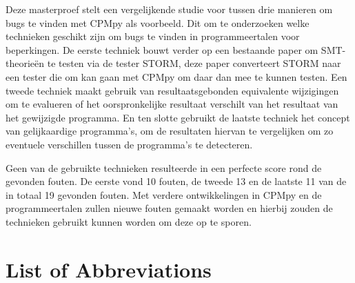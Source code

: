 \documentclass[master=cws, masteroption=se, english, oneside]{kulemt} %
\begin{document}
\begin{abstract*}
%
Deze masterproef stelt een vergelijkende studie voor tussen drie manieren om bugs te vinden met CPMpy als voorbeeld. Dit om te onderzoeken welke technieken geschikt zijn om bugs te vinden in programmeertalen voor beperkingen.
De eerste techniek bouwt verder op een bestaande paper om SMT-theorieën te testen via de tester STORM, deze paper converteert STORM naar een tester die om kan gaan met CPMpy om daar dan mee te kunnen testen.
Een tweede techniek maakt gebruik van resultaatsgebonden equivalente wijzigingen om te evalueren of het oorspronkelijke resultaat verschilt van het resultaat van het gewijzigde programma. En ten slotte gebruikt de laatste techniek het concept van gelijkaardige programma's, om de resultaten hiervan te vergelijken om zo eventuele verschillen tussen de programma's te detecteren.

Geen van de gebruikte technieken resulteerde in een perfecte score rond de gevonden fouten. De eerste vond 10 fouten, de tweede 13 en de laatste 11 van de in totaal 19 gevonden fouten. Met verdere ontwikkelingen in CPMpy en de programmeertalen zullen nieuwe fouten gemaakt worden en hierbij zouden de technieken gebruikt kunnen worden om deze op te sporen.


\end{abstract*}

\listoffigures
\listoftables
\lstlistoflistings
\chapter{List of Abbreviations}
\end{document}
